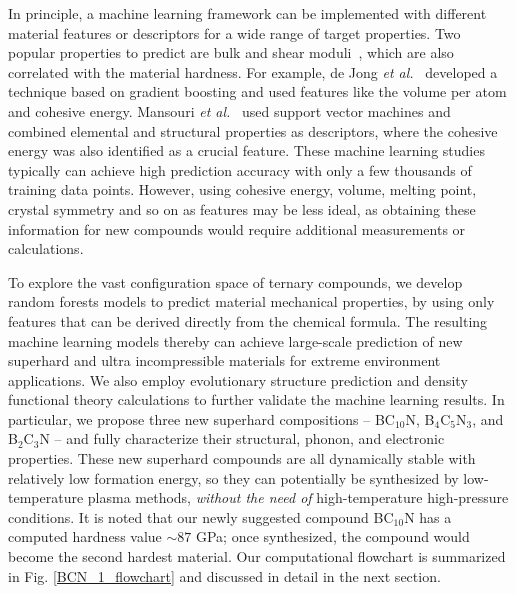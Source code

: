 	In principle, a machine learning framework can be implemented with different material features or descriptors for a wide range of target properties. Two popular properties to predict are bulk and shear moduli~\cite{furmanchuk2016predictive, de2016statistical, isayev2017universal, evans2017predicting,Mansouri2018, Avery2019}, which are also correlated with the material hardness.
	For example, de Jong {\it et al.}~\cite{de2016statistical} developed a technique based on gradient boosting and used features like the volume per atom and cohesive energy.
	Mansouri {\it et al.}~\cite{Mansouri2018} used support vector machines and combined elemental and structural properties as descriptors, where the cohesive energy was also identified as a crucial feature.
	These machine learning studies typically can achieve high prediction accuracy with only a few thousands of training data points. However, using cohesive energy, volume, melting point, crystal symmetry and so on as features may be less ideal, as obtaining these information for new compounds would require additional measurements or calculations.
	

	To explore the vast configuration space of ternary compounds, we develop random forests models to predict material mechanical properties, by using only features that can be derived directly from the chemical formula. The resulting machine learning models thereby can achieve large-scale prediction of new superhard and ultra incompressible materials for extreme environment applications.
	We also employ evolutionary structure prediction and density functional theory calculations to further validate the machine learning results.
	In particular, we propose three new superhard compositions -- BC$_{10}$N, B$_4$C$_5$N$_3$, and B$_2$C$_3$N -- and fully characterize their structural, phonon, and electronic properties. These new superhard compounds are all dynamically stable with relatively low formation energy, so they can potentially be synthesized by low-temperature plasma methods, {\it without the need of} high-temperature high-pressure conditions. It is noted that our newly suggested compound BC$_{10}$N has a computed hardness value $\sim 87$ GPa; once synthesized, the compound would become the second hardest material. Our computational flowchart is summarized in Fig. \ref{BCN_1_flowchart} and discussed in detail in the next section. 

